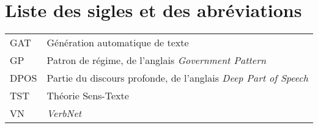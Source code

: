 \cleardoublepage
{}  %
\tableofcontents				%
\cleardoublepage
{}
\listoftables
\cleardoublepage
{}
\listoffigures	



\chapter*{Liste des sigles et des abréviations}
\begingroup %
\renewcommand{\arraystretch}{2} 
\noindent\begin{tabular}{p{} p{}}
  GAT & Génération automatique de texte \\
  GP & Patron de régime, de l'anglais \textit{Government Pattern}\\
  DPOS  &  Partie du discours profonde, de l'anglais \textit{Deep Part of Speech}\\
  TST & Théorie Sens-Texte\\
  VN & \emph{VerbNet}\\
\end{tabular}
\endgroup  %


